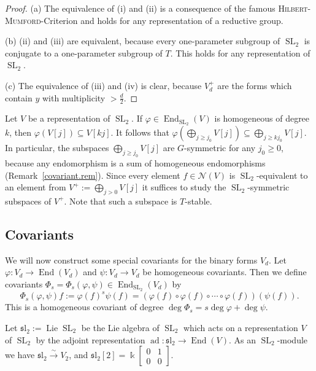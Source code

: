 \documentclass{amsart}
\theoremstyle{definition}
\theoremstyle{remark}
\begin{document}
\begin{proof}
(a) The equivalence of (i) and (ii) is a consequence of the famous {\textsc{{Hilbert-Mumford}\/}}-Criterion and holds for any representation of a reductive group.
\par\smallskip
(b) (ii) and (iii) are equivalent, because every one-parameter subgroup of ${\operatorname{SL}_{2}}$ is conjugate to a one-parameter subgroup of $T$. This holds for any representation of ${\operatorname{SL}_{2}}$.
\par\smallskip
(c) The equivalence of (iii) and (iv) is clear, because $V_{d}^{+}$ are the forms which contain $y$ with multiplicity $>\frac{d}{2}$.
\end{proof}

Let $V$ be a representation of ${\operatorname{SL}_{2}}$.  If ${\varphi}\in \operatorname{End}_{\operatorname{SL}_{2}}(V)$ is homogeneous of degree $k$, then ${\varphi}(V[j]) {\subseteq} V[kj]$.  
It follows that 
${\varphi}(\bigoplus_{j\geq j_{0}}V[j]) {\subseteq} \bigoplus_{j\geq k j_{0}}V[j]$.
In particular, the  subspaces $\bigoplus_{j\geq j_{0}}V[j]$ are $G$-symmetric for any $j_{0}\geq 0$, because any endomorphism is a sum of homogeneous endomorphisms (Remark~\ref{covariant.rem}). Since every element $f \in {\mathcal N}(V)$  is ${\operatorname{SL}_{2}}$-equivalent to an element from $V^{+}:=\bigoplus_{j>0}V[j]$ it suffices to study the 
${\operatorname{SL}_{2}}$-symmetric subspaces of $V^{+}$. Note that such a subspace is $T$-stable. 

{\par\smallskip}
\subsection{Covariants}
We will now construct some special covariants for the binary forms $V_{d}$.
Let ${\varphi}\colon V_{d} \to \operatorname{End}(V_{d})$ and $\psi\colon V_{d} \to V_{d}$ be homogeneous covariants. Then we define covariants $\Phi_{s}=\Phi_{s}({\varphi},\psi)\in \operatorname{End}_{\operatorname{SL}_{2}}(V_{d})$ by
$$
\Phi_{s}({\varphi},\psi)f := {\varphi}(f)^{s}\psi(f)=({\varphi}(f)\circ{\varphi}(f)\circ\cdots\circ{\varphi}(f))(\psi(f)).
$$
This is a homogeneous covariant of degree $\deg\Phi_{s}= s\deg{\varphi} + \deg \psi$. 

Let $\operatorname{{\mathfrak sl}_{2}} := \operatorname{Lie} {\operatorname{SL}_{2}}$ be the Lie algebra of ${\operatorname{SL}_{2}}$ which acts on a representation  $V$ of ${\operatorname{SL}_{2}}$ by the adjoint representation $\operatorname{ad}\colon \operatorname{{\mathfrak sl}_{2}} \to \operatorname{End}(V)$. As an ${\operatorname{SL}_{2}}$-module we have $\operatorname{{\mathfrak sl}_{2}} {\xrightarrow{\sim}} V_{2}$, and $\operatorname{{\mathfrak sl}_{2}}[2] = {\Bbbk}{\left[\begin{smallmatrix} 0 & 1 \\ 0 & 0\end{smallmatrix}\right]}$.
\end{document}
